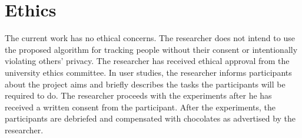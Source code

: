 


\chapter{Ethics}

\label{chapter:ethics}

The current work has no ethical concerns. The researcher does not intend to use the proposed algorithm for tracking people without their consent or intentionally violating others' privacy. The researcher has received ethical approval from the university ethics committee. In user studies, the researcher informs participants about the project aims and briefly describes the tasks the participants will be required to do. The researcher proceeds with the experiments after he has received a written consent from the participant. After the experiments, the participants are debriefed and compensated with chocolates as advertised by the researcher.


